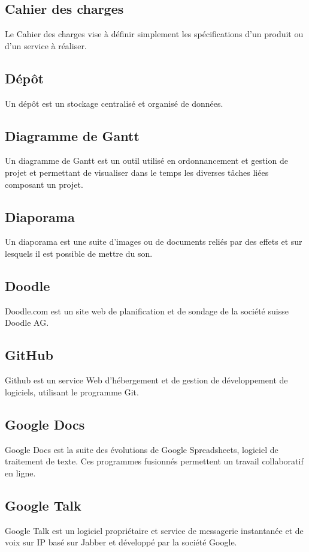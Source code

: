 \documentclass{life-fr}
\begin{document}
\subsection{ Cahier des charges}
Le Cahier des charges vise à définir simplement les spécifications d’un produit ou d’un service à réaliser.

\subsection{ Dépôt}
Un dépôt est un stockage centralisé et organisé de données.

\subsection{ Diagramme de Gantt}
Un diagramme de Gantt est un outil utilisé en ordonnancement et gestion de projet et permettant de visualiser dans le temps les diverses tâches liées composant un projet.

\subsection{ Diaporama}
Un diaporama est une suite d’images ou de documents reliés par des effets et sur lesquels il est possible de mettre du son.

\subsection{ Doodle}
Doodle.com est un site web de planification et de sondage de la société suisse Doodle AG.

\subsection{ GitHub}
Github est un service Web d'hébergement et de gestion de développement de logiciels, utilisant le programme Git. 

\subsection{ Google Docs}
Google Docs est la suite des évolutions de Google Spreadsheets, logiciel de traitement de texte. Ces programmes fusionnés permettent un travail collaboratif en ligne.

\subsection{ Google Talk}
Google Talk est un logiciel propriétaire et service de messagerie instantanée et de voix sur IP basé sur Jabber et développé par la société Google.
\end{document}
